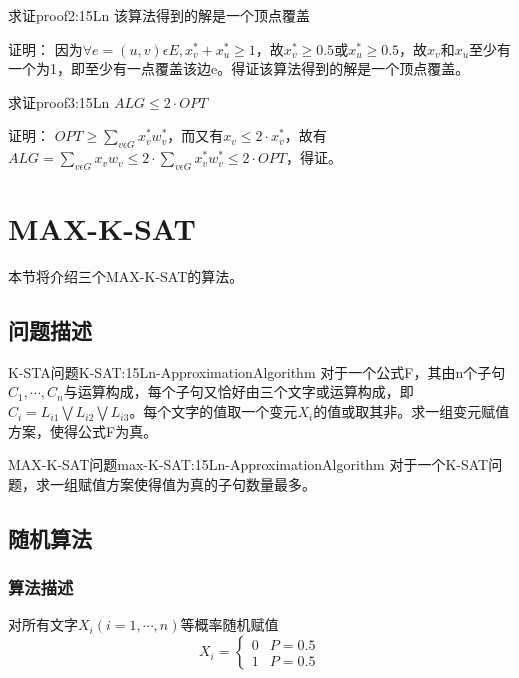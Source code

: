 \begin{proposition}{求证}{proof2:15Ln}
	该算法得到的解是一个顶点覆盖
\end{proposition}
证明：
	因为$\forall e=(u,v)\epsilon E,x_v^*+x_u^*\geqslant 1$，故$x_v^*\geqslant 0.5$或$x_u^*\geqslant 0.5$，故$x_v$和$x_u$至少有一个为1，即至少有一点覆盖该边e。得证该算法得到的解是一个顶点覆盖。
\begin{proposition}{求证}{proof3:15Ln}
	$ALG\leqslant 2\cdot OPT$
\end{proposition}
证明：
	$OPT\geqslant \sum\limits_{v\epsilon G} x_v^*w_v^*$，而又有$x_v\leqslant 2\cdot x_v^*$，故有
	$ALG=\sum\limits_{v\epsilon G} x_vw_v\leqslant 2\cdot \sum\limits_{v\epsilon G} x_v^*w_v^*\leqslant 2\cdot OPT$，得证。

\section{MAX-K-SAT}

本节将介绍三个MAX-K-SAT的算法。

\subsection{问题描述}

\begin{definition}{K-STA问题}{K-SAT:15Ln-ApproximationAlgorithm}
	对于一个公式F，其由n个子句${C_1,\cdots ,C_n}$与运算构成，每个子句又恰好由三个文字或运算构成，即$C_i=L_{i1}\bigvee L_{i2}\bigvee L_{i3}$。每个文字的值取一个变元$X_i$的值或取其非。求一组变元赋值方案，使得公式F为真。
\end{definition}

\begin{definition}{MAX-K-SAT问题}{max-K-SAT:15Ln-ApproximationAlgorithm}
	对于一个K-SAT问题，求一组赋值方案使得值为真的子句数量最多。
\end{definition}

\subsection{随机算法}

\subsubsection{算法描述}

对所有文字$X_i (i=1,\cdots,n)$等概率随机赋值
\[
	X_i=\begin{cases}
		0 &P=0.5\\
		1 &P=0.5
	\end{cases}
\]

